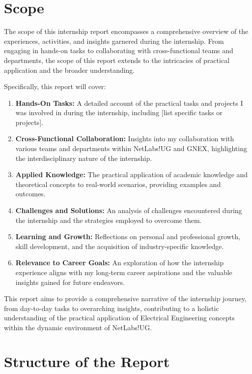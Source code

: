 \section{Scope}

The scope of this internship report encompasses a comprehensive overview of the experiences, activities, and insights garnered during the internship. From engaging in hands-on tasks  to collaborating with cross-functional teams and departments, the scope of this report extends to the intricacies of practical application and the broader understanding.

Specifically, this report will cover:
\begin{enumerate}
    \item \textbf{Hands-On Tasks:} A detailed account of the practical tasks and projects I was involved in during the internship, including [list specific tasks or projects].
    \item \textbf{Cross-Functional Collaboration:} Insights into my collaboration with various teams and departments within NetLabs!UG and GNEX, highlighting the interdisciplinary nature of the internship.
    \item \textbf{Applied Knowledge:} The practical application of academic knowledge and theoretical concepts to real-world scenarios, providing examples and outcomes.
    \item \textbf{Challenges and Solutions:} An analysis of challenges encountered during the internship and the strategies employed to overcome them.
    \item \textbf{Learning and Growth:} Reflections on personal and professional growth, skill development, and the acquisition of industry-specific knowledge.
    \item \textbf{Relevance to Career Goals:} An exploration of how the internship experience aligns with my long-term career aspirations and the valuable insights gained for future endeavors.
\end{enumerate}
This report aims to provide a comprehensive narrative of the internship journey, from day-to-day tasks to overarching insights, contributing to a holistic understanding of the practical application of Electrical Engineering concepts within the dynamic environment of NetLabs!UG.

\section{Structure of the Report}

